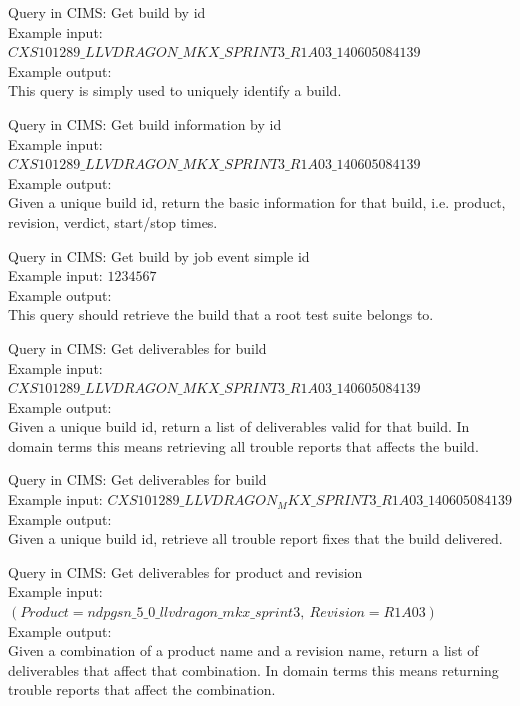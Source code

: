 Query in CIMS: Get build by id \\
Example input: $CXS101289\_LLVDRAGON\_MKX\_SPRINT3\_R1A03\_140605084139$ \\
Example output: \\
This query is simply used to uniquely identify a build.

Query in CIMS: Get build information by id \\
Example input: $CXS101289\_LLVDRAGON\_MKX\_SPRINT3\_R1A03\_140605084139$ \\
Example output: \\
Given a unique build id, return the basic information for that build, i.e. product, revision, verdict, start/stop times.

Query in CIMS: Get build by job event simple id \\
Example input: $1234567$ \\
Example output: \\
This query should retrieve the build that a root test suite belongs to.

Query in CIMS: Get deliverables for build \\
Example input: $CXS101289\_LLVDRAGON\_MKX\_SPRINT3\_R1A03\_140605084139$ \\
Example output: \\
Given a unique build id, return a list of deliverables valid for that build. In domain terms this means retrieving all trouble reports that affects the build.

Query in CIMS: Get deliverables for build \\
Example input: $CXS101289\_LLVDRAGON_MKX\_SPRINT3\_R1A03\_140605084139$ \\
Example output: \\
Given a unique build id, retrieve all trouble report fixes that the build delivered.

Query in CIMS: Get deliverables for product and revision \\
Example input: $(Product=ndpgsn\_5\_0\_llvdragon\_mkx\_sprint3,\ Revision=R1A03)$ \\
Example output: \\
Given a combination of a product name and a revision name, return a list of deliverables that affect that combination. In domain terms this means returning trouble reports that affect the combination.

